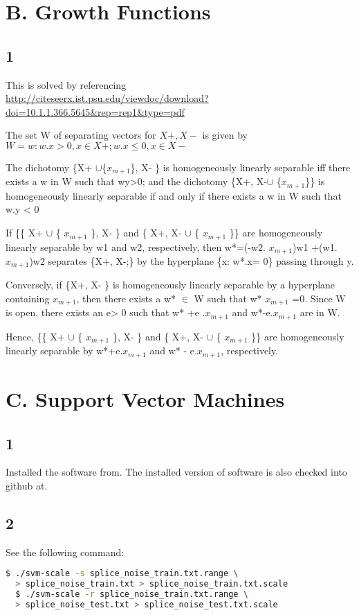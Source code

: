 \documentclass{article}
\begin{document}
\section*{B. Growth Functions}
\subsection*{1}
This is solved by referencing \\ \url{http://citeseerx.ist.psu.edu/viewdoc/download?doi=10.1.1.366.5645&rep=rep1&type=pdf}

The set W of separating vectors for ${ X+, X-}$ is given by 
$W= { w: w.x>0, x \in X+ ;  w.x \le 0, x \in X-}$

The dichotomy \{X+ $\cup$\{$x_{m+1}$\}, X- \}  is homogeneously linearly separable iff there exists a w in W such that wy>0; and the dichotomy \{X+, X-$\cup$ \{$x_{m+1}$\}\} is homogeneously linearly separable if and only if there exists a w in W such that w.y < 0 


If \{\{ X+ $\cup$ \{ $x_{m+1}$ \}, X- \} and \{ X+, X- $\cup$ \{ $x_{m+1}$ \}\} are homogeneously linearly separable by w1 and w2, respectively, then w*=(-w2. $x_{m+1}$)w1 +(w1.$x_{m+1}$)w2 separates \{X+, X-;\} by the hyperplane \{x: w*.x= 0\} passing through y.

  Conversely, if \{X+, X- \} is homogeneously linearly separable by a hyperplane containing $x_{m+1}$, then there exists a w* $\in$ W such that w* $x_{m+1}$ =0. Since W is open, there exists an e> 0 such that w* +e .$x_{m+1}$  and w*-e.$x_{m+1}$  are in W.

  Hence, \{\{ X+ $\cup$ \{ $x_{m+1}$ \}, X- \} and \{ X+, X- $\cup$ \{ $x_{m+1}$ \}\} are homogeneously linearly separable by w*+e.$x_{m+1}$  and w* - e.$x_{m+1}$, respectively.

\section*{C. Support Vector Machines}
\subsection*{1}
Installed the software from\cite{libsvm}.  The installed version of software is also checked into github at\cite{githuburl}. 
\subsection*{2}

\noindent See the following command:
\begin{lstlisting}[language=bash]
  $ ./svm-scale -s splice_noise_train.txt.range \  
  > splice_noise_train.txt > splice_noise_train.txt.scale
  $ ./svm-scale -r splice_noise_train.txt.range \
  > splice_noise_test.txt > splice_noise_test.txt.scale
\end{lstlisting}
\end{document}
